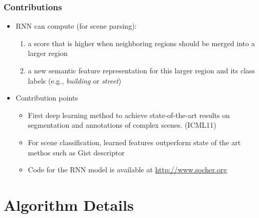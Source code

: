 \documentclass{beamer}
\begin{document}
\frame
{
	\frametitle{Contributions}
	\begin{itemize}
		\item RNN can compute (for scene parsing):
			\begin{enumerate}
			\item a score that is higher when neighboring regions should be merged into a larger region
			\item a new semantic feature representation for this larger region and its class labels (e.g., \textit{building} or \textit{street})
			\end{enumerate}
		\item Contribution points
			\begin{itemize}
			\item First deep learning method to achieve state-of-the-art results on segmentation and annotations of complex scenes. (ICML11)
			\item For scene classification, learned features outperform state of the art methos such as Gist descriptor 
			\item Code for the RNN model is available at \url{http://www.socher.org}
			\end{itemize}
	\end{itemize}
}
\section{Algorithm Details}
\frame{\tableofcontents}
\end{document}
